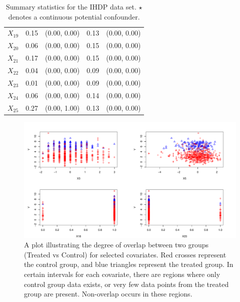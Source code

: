\begin{table}[ht]
\begin{tabular}{l|cc|cc}
  $X_{19}$ & 0.15 & (0.00, 0.00) & 0.13 & (0.00, 0.00) \\ 
  $X_{20}$ & 0.06 & (0.00, 0.00) & 0.15 & (0.00, 0.00) \\ 
  $X_{21}$ & 0.17 & (0.00, 0.00) & 0.15 & (0.00, 0.00) \\ 
  $X_{22}$ & 0.04 & (0.00, 0.00) & 0.09 & (0.00, 0.00) \\ 
  $X_{23}$ & 0.01 & (0.00, 0.00) & 0.09 & (0.00, 0.00) \\ 
  $X_{24}$ & 0.06 & (0.00, 0.00) & 0.14 & (0.00, 0.00) \\ 
  $X_{25}$ & 0.27 & (0.00, 1.00) & 0.13 & (0.00, 0.00) \\ 
   \hline
\end{tabular}
\caption{Summary statistics for the IHDP data set. $\star$ denotes a continuous potential confounder.} 
\label{tab:iphd}
\end{table}

\begin{figure}[htbp]
\includegraphics[width=\linewidth]{fig/overlap.pdf}
\caption{A plot illustrating the degree of overlap between two groups (Treated vs Control) for selected covariates. Red crosses represent the control group, and blue triangles represent the treated group. In certain intervals for each covariate, there are regions where only control group data exists, or very few data points from the treated group are present. Non-overlap occurs in these regions.}\label{fig:ioverlap}
\end{figure}



